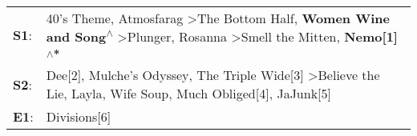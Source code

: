 \begin{supertabular}{p{0.03\textwidth}p{0.92\textwidth}}
 \textbf{S1}:  &  40's Theme\textsuperscript{}, \enspace Atmosfarag\textsuperscript{} \textgreater \enspace The Bottom Half\textsuperscript{}, \enspace \textbf{Women Wine and Song\textsuperscript{$\wedge$}} \textgreater \enspace Plunger\textsuperscript{}, \enspace Rosanna\textsuperscript{} \textgreater \enspace Smell the Mitten\textsuperscript{}, \enspace \textbf{Nemo[1]\textsuperscript{$\wedge$*}}  \enspace  \\
 \textbf{S2}:  &                                                           Dee[2]\textsuperscript{}, \enspace Mulche's Odyssey\textsuperscript{}, \enspace The Triple Wide[3]\textsuperscript{} \textgreater \enspace Believe the Lie\textsuperscript{}, \enspace Layla\textsuperscript{}, \enspace Wife Soup\textsuperscript{}, \enspace Much Obliged[4]\textsuperscript{}, \enspace JaJunk[5]\textsuperscript{}  \enspace  \\
 \textbf{E1}:  &                                                                                                                                                                                                                                                                                                                                                                   Divisions[6]\textsuperscript{}  \enspace  \\
\end{supertabular}
